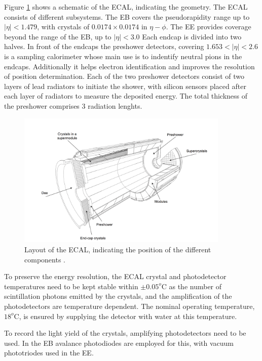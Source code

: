 Figure \ref{fig:CMS_ECAL} shows a schematic of the \ac{ECAL}, indicating
the geometry. The \ac{ECAL} consists of different subsystems. The \ac{EB} 
covers the pseudorapidity range up to $|\eta|<1.479$, with
crystals of $0.0174 \times 0.0174$ in $\eta - \phi$. The \ac{EE}
provides coverage beyond the range of the \ac{EB}, up to $|\eta|<3.0$
Each endcap is divided into two halves. In front of the endcaps 
the preshower detectors, covering $1.653<|\eta|<2.6$ is a sampling
calorimeter whose main use is to indentify neutral pions in the endcaps. Additionally
it helps electron identification and improves the resolution
of position determination. Each of the two preshower detectors consist
of two layers of lead radiators to initiate the shower, with silicon sensors
placed after each layer of radiators to measure the deposited energy. The 
total thickness of the preshower comprises 3 radiation lenghts.

\begin{figure}[h!]
\begin{center}
\includegraphics[width=0.9\textwidth]{./Detector/Plots/ECAL.png}
\caption{Layout of the \ac{ECAL}, indicating the position of the
different components \cite{cms-jinst}.}
\label{fig:CMS_ECAL}
\end{center}
\end{figure}

To preserve the energy resolution, the \ac{ECAL} crystal and
photodetector temperatures need to be kept stable within $\pm 0.05^o$C
as the number of scintillation photons emitted by the crystals,
and the amplification of the photodetectors are temperature dependent.
The nominal operating temperature, $18^o$C, is ensured by 
supplying the detector with water at this temperature.

To record the light yield of the crystals, amplifying photodetectors
need to be used. In the \ac{EB} avalance photodiodes are employed
for this, with vacuum phototriodes used in the \ac{EE}.

